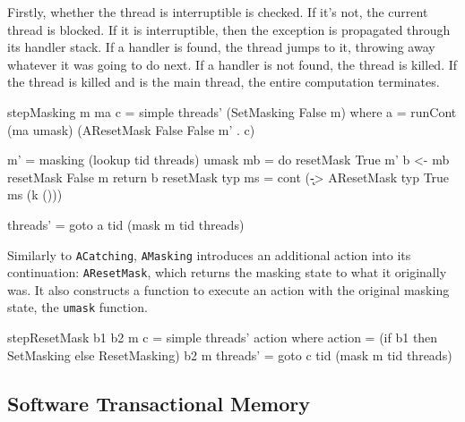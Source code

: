 
Firstly, whether the thread is interruptible is checked. If it's not,
the current thread is blocked. If it is interruptible, then the
exception is propagated through its handler stack. If a handler is
found, the thread jumps to it, throwing away whatever it was going to
do next. If a handler is not found, the thread is killed. If the
thread is killed and is the main thread, the entire computation
terminates.

\begin{haskellcode}
stepMasking m ma c = simple threads' (SetMasking False m)
  where
  a = runCont (ma umask) (AResetMask False False m' . c)

  m' = masking (lookup tid threads)
  umask mb = do
    resetMask True m'
    b <- mb
    resetMask False m
    return b
  resetMask typ ms = cont (\k -> AResetMask typ True ms (k ()))

  threads' = goto a tid (mask m tid threads)
\end{haskellcode}

Similarly to \verb|ACatching|, \verb|AMasking| introduces an
additional action into its continuation: \verb|AResetMask|, which
returns the masking state to what it originally was. It also
constructs a function to execute an action with the original masking
state, the \verb|umask| function.

\begin{haskellcode}
stepResetMask b1 b2 m c = simple threads' action where
  action   = (if b1 then SetMasking else ResetMasking) b2 m
  threads' = goto c tid (mask m tid threads)
\end{haskellcode}

\subsection{Software Transactional Memory}
\label{sec:execution-stepwise-stm}

